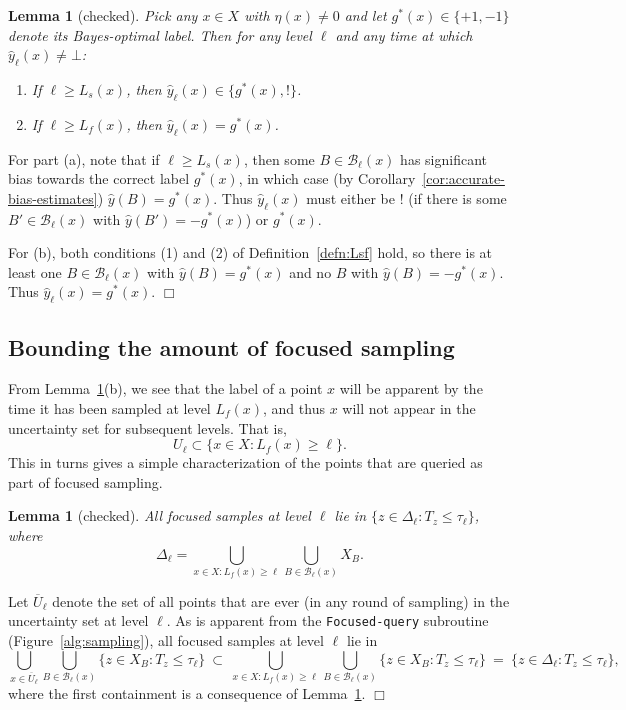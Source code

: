 \documentclass{article}
\def\B{{\mathcal B}}
\def\yh{{\widehat{y}}}
\newtheorem{lemma}[thm]{Lemma}
\newenvironment{proof}{\noindent {\sc Proof:}}{$\Box$ \medskip}
\begin{document}
\begin{lemma}[checked]
Pick any $x \in X$ with $\eta(x) \neq 0$ and let $g^*(x) \in \{+1,-1\}$ denote its Bayes-optimal label. Then for any level $\ell$ and any time at which $\yh_\ell(x) \neq \bot$:
\begin{enumerate}
\item[(a)] If $\ell \geq L_s(x)$, then $\yh_\ell(x) \in \{g^*(x), !\}$.
\item[(b)] If $\ell \geq L_f(x)$, then $\yh_\ell(x) = g^*(x)$.
\end{enumerate}
\label{lemma:boundary}
\end{lemma}
\begin{proof}
For part (a), note that if $\ell \geq L_s(x)$, then some $B \in \B_\ell(x)$ has significant bias towards the correct label $g^*(x)$, in which case (by Corollary~\ref{cor:accurate-bias-estimates}) $\yh(B) = g^*(x)$. Thus $\yh_\ell(x)$ must either be $!$ (if there is some $B' \in \B_\ell(x)$ with $\yh(B') = -g^*(x)$) or $g^*(x)$.

For (b), both conditions (1) and (2) of Definition~\ref{defn:Lsf} hold, so there is at least one $B \in \B_\ell(x)$ with $\yh(B) = g^*(x)$ and no $B$ with $\yh(B) = -g^*(x)$. Thus $\yh_\ell(x) = g^*(x)$.
\end{proof}

\subsection{Bounding the amount of focused sampling}

From Lemma~\ref{lemma:boundary}(b), we see that the label of a point $x$ will be apparent by the time it has been sampled at level $L_f(x)$, and thus $x$ will not appear in the uncertainty set for subsequent levels. That is, 
$$U_{\ell} \subset \{x \in X: L_f(x) \geq \ell\}.$$ 
This in turns gives a simple characterization of the points that are queried as part of focused sampling.
\begin{lemma}[checked]
All focused samples at level $\ell$ lie in $\{z \in \Delta_\ell: T_z \leq \tau_\ell \}$, where
\begin{equation}
\Delta_\ell 
= \bigcup_{x \in X: L_f(x) \geq \ell} \bigcup_{B \in \B_{\ell}(x)} X_B 
.
\label{eq:sampling-region}
\end{equation}
\label{lemma:focused}
\end{lemma}
\begin{proof}
Let $\overline{U}_\ell$ denote the set of all points that are ever (in any round of sampling) in the uncertainty set at level $\ell$. As is apparent from the {\tt Focused-query} subroutine (Figure~\ref{alg:sampling}), all focused samples at level $\ell$ lie in
$$
\bigcup_{x \in \overline{U}_\ell} \bigcup_{B \in \B_\ell(x)} \{z \in X_B: T_z \leq \tau_\ell \}
\ 
\subset 
\ 
\bigcup_{x \in X: L_f(x) \geq \ell} \bigcup_{B \in \B_\ell(x)} \{z \in X_B: T_z \leq \tau_\ell \}
\ 
=
\ 
\{z \in \Delta_\ell: T_z \leq \tau_\ell \},
$$
where the first containment is a consequence of Lemma~\ref{lemma:boundary}.
\end{proof}
\end{document}
